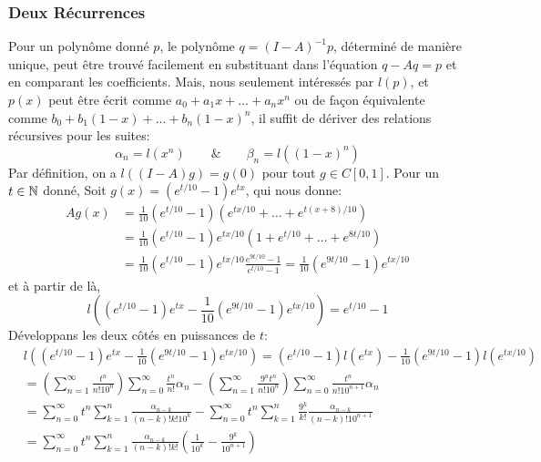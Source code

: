 \subsubsection{Deux R\'ecurrences}
Pour un polyn\^{o}me donn\'e $p$, le polyn\^{o}me $q = (I-A)^{-1}p$,
d\'etermin\'e de mani\`ere unique, peut \^{e}tre trouv\'e facilement en
substituant dans l'\'equation $q-Aq = p$ et en comparant les coefficients. Mais,
nous seulement int\'eress\'es par $l(p)$, et $p(x)$ peut \^{e}tre \'ecrit comme
\( a_0 + a_1x + \dots + a_nx^n \) ou de façon \'equivalente comme \( b_0 + b_1(1
- x) + \dots + b_n(1 - x)^n \), il suffit de d\'eriver des relations
r\'ecursives pour les suites:
\[
	\alpha_{n} = l(x^{n}) \qquad \& \qquad \beta_{n} = l((1-x)^{n})
\]
Par d\'efinition, on a \( l((I - A)g) = g(0) \) pour tout $g\in C[0,1]$. Pour un
$t\in \mathbb{N}$ donn\'e, Soit \( g(x) = (e^{t/10} - 1)e^{tx} \), qui nous donne:
\begin{equation*}
	\begin{split}
		Ag(x) &= \frac{1}{10} (e^{t/10} - 1) \left( e^{tx/10} + \ldots +
		e^{t(x+8)/10} \right) \\
		&= \frac{1}{10} (e^{t/10} - 1) e^{tx/10} \left( 1 + e^{t/10} + \ldots +
		e^{8t/10} \right) \\
		&= \frac{1}{10} (e^{t/10} - 1) e^{tx/10}
		\frac{e^{9t/10}-1}{e^{t/10}-1} = \frac{1}{10}(e^{9t/10}-1)e^{tx/10} 
	\end{split}
\end{equation*}
et \`a partir de l\`a,
\[
	l \left( (e^{t/10}-1)e^{tx} - \frac{1}{10}(e^{9t/10}-1)e^{tx/10} \right) =
	e^{t/10}-1
\]
D\'eveloppans les deux c\^{o}t\'es en puissances de $t$:
\begin{align*}
	&l \left( (e^{t/10}-1)e^{tx} - \frac{1}{10}(e^{9t/10}-1)e^{tx/10} \right) =
	(e^{t/10} - 1)l( e^{tx})- \frac{1}{10}(e^{9t/10}-1)l(e^{tx/10}) \\
	&= \left( \sum_{n=1}^{\infty}\frac{t^{n}}{n!10^{n}}\right)
	\sum_{n=0}^{\infty} \frac{t^{n}}{n!}\alpha_{n} - \left(
	\sum_{n=1}^{\infty}\frac{9^{n}t^{n}}{n!10^{n}} \right) \sum_{n=0}^{\infty}
	\frac{t^{n}}{n! 10^{n+1}} \alpha_{n}\\
	&= \sum_{n=0}^{\infty}t^{n}\sum_{k=1}^{n}
	\frac{\alpha_{n-k}}{(n-k)!k!10^{k}} - \sum_{n=0}^{\infty} t^{n}
	\sum_{k=1}^{n} \frac{9^{k}}{k!} \frac{\alpha_{n-k}}{(n-k)!10^{n+1}}\\
	&= \sum_{n=0}^{\infty} t^{n} \sum_{k=1}^{n} \frac{\alpha_{n-k}}{(n-k)! k!}
	\left( \frac{1}{10^{k}} - \frac{9^{k}}{10^{n+1}} \right)
\end{align*}
